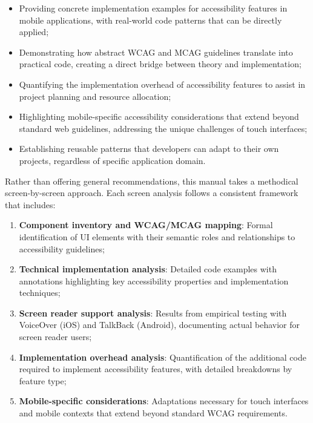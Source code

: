 \begin{itemize}
    \item Providing concrete implementation examples for accessibility features in mobile applications, with real-world code patterns that can be directly applied;
    
    \item Demonstrating how abstract WCAG and MCAG guidelines translate into practical code, creating a direct bridge between theory and implementation;
    
    \item Quantifying the implementation overhead of accessibility features to assist in project planning and resource allocation;
    
    \item Highlighting mobile-specific accessibility considerations that extend beyond standard web guidelines, addressing the unique challenges of touch interfaces;
    
    \item Establishing reusable patterns that developers can adapt to their own projects, regardless of specific application domain.
\end{itemize}

Rather than offering general recommendations, this manual takes a methodical screen-by-screen approach. Each screen analysis follows a consistent framework that includes:

\begin{enumerate}
    \item \textbf{Component inventory and WCAG/MCAG mapping}: Formal identification of UI elements with their semantic roles and relationships to accessibility guidelines;
    
    \item \textbf{Technical implementation analysis}: Detailed code examples with annotations highlighting key accessibility properties and implementation techniques;
    
    \item \textbf{Screen reader support analysis}: Results from empirical testing with VoiceOver (iOS) and TalkBack (Android), documenting actual behavior for screen reader users;
    
    \item \textbf{Implementation overhead analysis}: Quantification of the additional code required to implement accessibility features, with detailed breakdowns by feature type;
    
    \item \textbf{Mobile-specific considerations}: Adaptations necessary for touch interfaces and mobile contexts that extend beyond standard WCAG requirements.
\end{enumerate}

